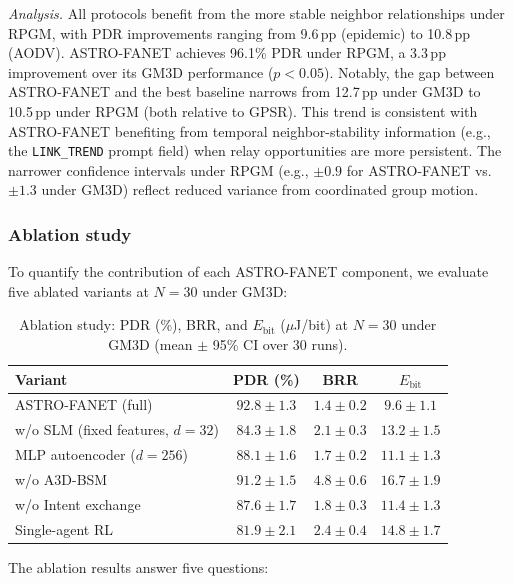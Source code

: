\documentclass[5p,times]{elsarticle}
\begin{document}
\textit{Analysis.} All protocols benefit from the more stable neighbor relationships under RPGM, with PDR improvements ranging from 9.6\,pp (epidemic) to 10.8\,pp (AODV). ASTRO-FANET achieves 96.1\% PDR under RPGM, a 3.3\,pp improvement over its GM3D performance ($p < 0.05$). Notably, the gap between ASTRO-FANET and the best baseline narrows from 12.7\,pp under GM3D to 10.5\,pp under RPGM (both relative to GPSR). This trend is consistent with ASTRO-FANET benefiting from temporal neighbor-stability information (e.g., the \texttt{LINK\_TREND} prompt field) when relay opportunities are more persistent. The narrower confidence intervals under RPGM (e.g., $\pm 0.9$ for ASTRO-FANET vs.\ $\pm 1.3$ under GM3D) reflect reduced variance from coordinated group motion.

\subsubsection{Ablation study}
\label{subsec:ablation}

To quantify the contribution of each ASTRO-FANET component, we evaluate five ablated variants at $N=30$ under GM3D:

\begin{table}[t]
\centering
\caption{Ablation study: PDR (\%), BRR, and $E_{\mathrm{bit}}$ ($\mu$J/bit) at $N=30$ under GM3D (mean $\pm$ 95\% CI over 30 runs).}
\label{tab:ablation}
\scriptsize
\begin{tabular}{lccc}
\toprule
Variant & PDR (\%) & BRR & $E_{\mathrm{bit}}$ \\
\midrule
ASTRO-FANET (full) & $\mathbf{92.8 \pm 1.3}$ & $\mathbf{1.4 \pm 0.2}$ & $\mathbf{9.6 \pm 1.1}$ \\
w/o SLM (fixed features, $d{=}32$) & $84.3 \pm 1.8$ & $2.1 \pm 0.3$ & $13.2 \pm 1.5$ \\
MLP autoencoder ($d{=}256$) & $88.1 \pm 1.6$ & $1.7 \pm 0.2$ & $11.1 \pm 1.3$ \\
w/o A3D-BSM & $91.2 \pm 1.5$ & $4.8 \pm 0.6$ & $16.7 \pm 1.9$ \\
w/o Intent exchange & $87.6 \pm 1.7$ & $1.8 \pm 0.3$ & $11.4 \pm 1.3$ \\
Single-agent RL & $81.9 \pm 2.1$ & $2.4 \pm 0.4$ & $14.8 \pm 1.7$ \\
\bottomrule
\end{tabular}
\end{table}

The ablation results answer five questions:
\end{document}
